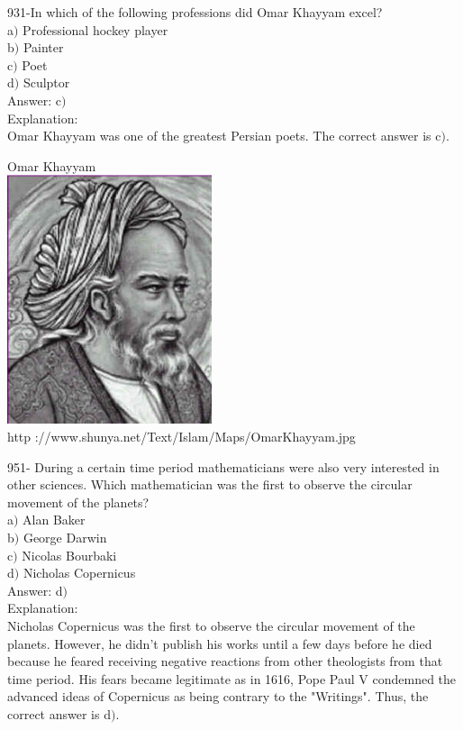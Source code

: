 \documentclass[letterpaper, 12pt]{article}
\begin{document}
931-In which of the following professions did Omar Khayyam excel?\\

a$)$ Professional hockey player \\
b$)$ Painter \\
c$)$ Poet \\
d$)$ Sculptor \\

Answer: c$)$\\

Explanation: \\
Omar Khayyam was one of the greatest Persian poets. The correct answer is c$)$.\\

        \begin{center}
        Omar Khayyam\\
    \includegraphics[width=6cm]{Omar.eps}\\
        {\footnotesize http
://www.shunya.net/Text/Islam/Maps/OmarKhayyam.jpg}
    \end{center}


951- During a certain time period mathematicians were also very interested in other sciences. Which mathematician was the first to observe the circular movement of the planets?\\

a$)$ Alan Baker \\
b$)$ George Darwin \\
c$)$ Nicolas Bourbaki  \\
d$)$ Nicholas Copernicus \\

Answer: d$)$\\

Explanation: \\
Nicholas Copernicus was the first to observe the circular movement of the planets. However, he didn't publish his works until a few days before he died because he feared receiving negative reactions from other theologists from that time period. His fears became legitimate as in 1616, Pope Paul V condemned the advanced ideas of Copernicus as being contrary to the "Writings". Thus, the correct answer is d$)$.\\
\end{document}
